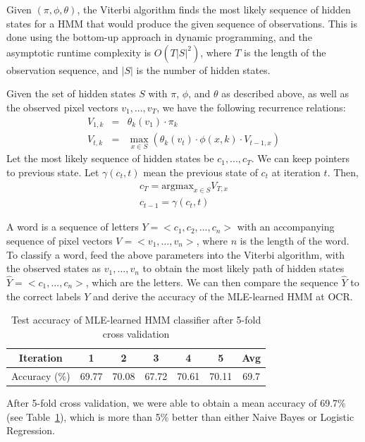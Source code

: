\documentclass{article} %
\begin{document}
Given $(\pi, \phi, \theta)$, the Viterbi algorithm finds the most likely sequence of hidden states for a HMM that would produce the given sequence of observations. This is done using the bottom-up approach in dynamic programming, and the asymptotic runtime complexity is $O(T|S|^2)$, where $T$ is the length of the observation sequence, and $|S|$ is the number of hidden states.

Given the set of hidden states $S$ with $\pi$, $\phi$, and $\theta$ as described above, as well as the observed pixel vectors $v_1, ..., v_T$, we have the following recurrence relations:
\begin{eqnarray*}
	V_{1,k} &=& \theta_k(v_1) \cdot \pi_k \\
	V_{t,k} &=& \max_{x \in S} \left( \theta_k (v_t) \cdot \phi(x,k) \cdot V_{t-1,x} \right)
\end{eqnarray*}
Let the most likely sequence of hidden states be $c_1, ..., c_T$. We can keep pointers to previous state. Let $\gamma(c_t, t)$ mean the previous state of $c_t$ at iteration $t$. Then,
\begin{eqnarray*}
	c_T = \mbox{argmax}_{x \in S} V_{T,x} \\
	c_{t-1} = \gamma(c_t, t)
\end{eqnarray*}

A word is a sequence of letters $Y = <c_1, c_2, ..., c_n>$ with an accompanying sequence of pixel vectors $V = <v_1, ..., v_n>$, where $n$ is the length of the word. To classify a word, feed the above parameters into the Viterbi algorithm, with the observed states as $v_1, ..., v_n$ to obtain the most likely path of hidden states $\hat{Y} = <c_1, ..., c_n>$, which are the letters. We can then compare the sequence $\hat{Y}$ to the correct labels $Y$ and derive the accuracy of the MLE-learned HMM at OCR.

\begin{table}[h]
\centering
\begin{tabular}{|c|c|c|c|c|c|c|}
\hline
Iteration & 1 & 2 & 3 & 4 & 5 & Avg \\
\hline 
Accuracy (\%) & 69.77 & 70.08 & 67.72 & 70.61 & 70.11 & 69.7 \\
\hline 
\end{tabular}
\caption{Test accuracy of MLE-learned HMM classifier after 5-fold cross validation}
\label{tab:mle-hmm-results}
\end{table}

After 5-fold cross validation, we were able to obtain a mean accuracy of 69.7\% (see Table~\ref{tab:mle-hmm-results}), which is more than 5\% better than either Naive Bayes or Logistic Regression.\\
\end{document}
